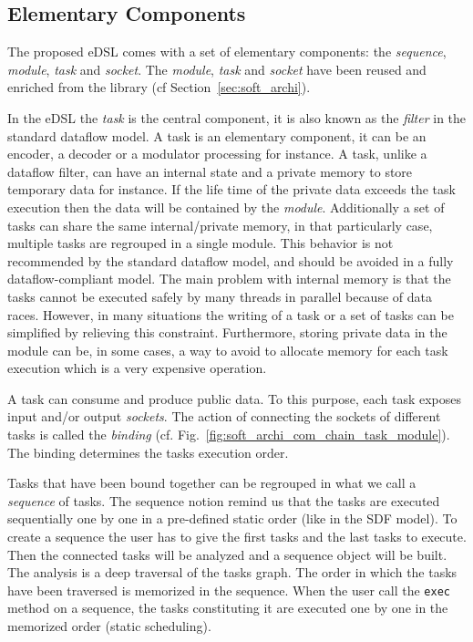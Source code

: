 \subsection{Elementary Components}


The proposed eDSL comes with a set of elementary components: the
\emph{sequence}, \emph{module}, \emph{task} and \emph{socket}. The
\emph{module}, \emph{task} and \emph{socket} have been reused and enriched
from the \AFFECT library (cf Section~\ref{sec:soft_archi}).

In the eDSL the \emph{task} is the central component, it is also known as the
\emph{filter} in the standard dataflow model. A task is an elementary component,
it can be an encoder, a decoder or a modulator processing for instance. A task,
unlike a dataflow filter, can have an internal state and a private memory to
store temporary data for instance. If the life time of the private data exceeds
the task execution then the data will be contained by the \emph{module}.
Additionally a set of tasks can share the same internal/private memory, in that
particularly case, multiple tasks are regrouped in a single module. This
behavior is not recommended by the standard dataflow model, and should be
avoided in a fully dataflow-compliant model. The main problem with internal
memory is that the tasks cannot be executed safely by many threads in parallel
because of data races. However, in many situations the writing of a task or a
set of tasks can be simplified by relieving this constraint. Furthermore,
storing private data in the module can be, in some cases, a way to avoid to
allocate memory for each task execution which is a very expensive operation.

A task can consume and produce public data. To this purpose, each task exposes
input and/or output \emph{sockets}. The action of connecting the sockets of
different tasks is called the \emph{binding} (cf.
Fig.~\ref{fig:soft_archi_com_chain_task_module}).
The binding determines the tasks execution order.

Tasks that have been bound together can be regrouped in what we call a
\emph{sequence} of tasks. The sequence notion remind us that the tasks are
executed sequentially one by one in a pre-defined static order (like in the SDF
model). To create a sequence the user has to give the first tasks and the
last tasks to execute. Then the connected tasks will be analyzed and a sequence
object will be built. The analysis is a deep traversal of the tasks graph. The
order in which the tasks have been traversed is memorized in the sequence.
When the user call the \verb|exec| method on a sequence, the tasks constituting
it are executed one by one in the memorized order (static scheduling).

